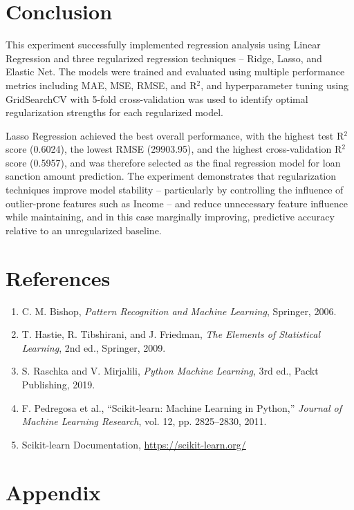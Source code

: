 \documentclass[12pt,a4paper]{article}
\begin{document}
\section{Conclusion}

This experiment successfully implemented regression analysis using Linear Regression and three regularized regression techniques -- Ridge, Lasso, and Elastic Net. The models were trained and evaluated using multiple performance metrics including MAE, MSE, RMSE, and R$^2$, and hyperparameter tuning using GridSearchCV with 5-fold cross-validation was used to identify optimal regularization strengths for each regularized model.

Lasso Regression achieved the best overall performance, with the highest test R$^2$ score (0.6024), the lowest RMSE (29903.95), and the highest cross-validation R$^2$ score (0.5957), and was therefore selected as the final regression model for loan sanction amount prediction. The experiment demonstrates that regularization techniques improve model stability -- particularly by controlling the influence of outlier-prone features such as Income -- and reduce unnecessary feature influence while maintaining, and in this case marginally improving, predictive accuracy relative to an unregularized baseline.

\section{References}

\begin{enumerate}
\item C. M. Bishop, \textit{Pattern Recognition and Machine Learning}, Springer, 2006.
\item T. Hastie, R. Tibshirani, and J. Friedman, \textit{The Elements of Statistical Learning}, 2nd ed., Springer, 2009.
\item S. Raschka and V. Mirjalili, \textit{Python Machine Learning}, 3rd ed., Packt Publishing, 2019.
\item F. Pedregosa et al., ``Scikit-learn: Machine Learning in Python,'' \textit{Journal of Machine Learning Research}, vol. 12, pp. 2825--2830, 2011.
\item Scikit-learn Documentation, \url{https://scikit-learn.org/}
\end{enumerate}

\section*{Appendix}
\end{document}
